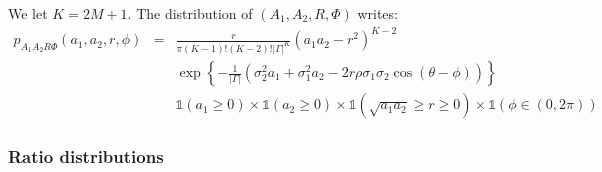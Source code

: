 We let $K=2M+1$.
The distribution of $(A_{1},A_{2},R,\Phi)$ writes:
\begin{eqnarray}
\label{eq:wiskart}
 p_{A_{1}A_{2}R\Phi}
 (a_{1},a_{2},r,\phi)
 &=&
 \frac{r}{\pi (K-1)!(K-2)!|\Gamma|^{K}}
 (a_{1}a_{2}-r^{2})^{K-2}
 \\
 &&
 \exp\left\{
 -\frac{1}{|\Gamma|}
 \left(\sigma_{2}^{2}a_{1}+\sigma_{1}^{2}a_{2}
 -2r\rho\sigma_{1}\sigma_{2}\cos(\theta-\phi)
 \right)
 \right\}
 \\
 &&
 \mathds{1}(a_{1}\geq 0)
 \times\mathds{1}(a_{2}\geq 0)
 \times\mathds{1}(\sqrt{a_{1}a_{2}}\geq r\geq 0)
 \times\mathds{1}(\phi\in(0,2\pi))
\end{eqnarray}


\subsubsection{Ratio distributions}

